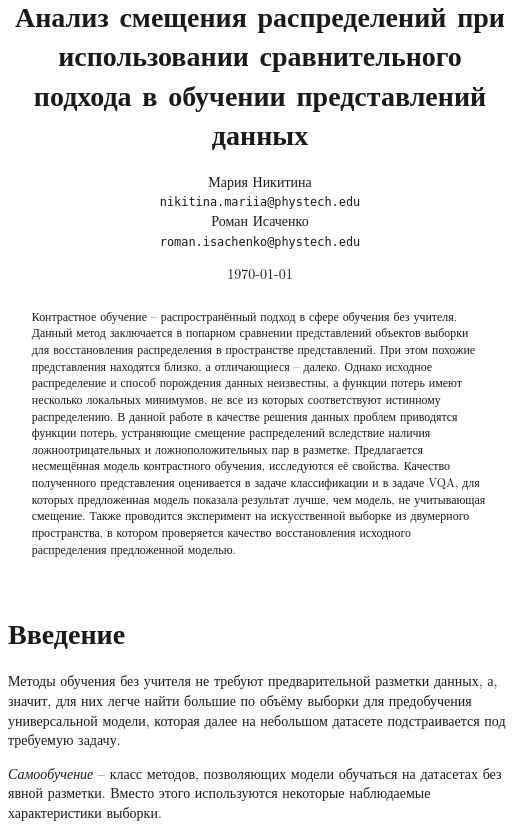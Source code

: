\documentclass[a4paper, 14pt]{article}
\title{Анализ смещения распределений при использовании сравнительного подхода в обучении представлений данных}
\author{
    Мария Никитина \\
	\texttt{nikitina.mariia@phystech.edu} \\
	\And
 	Роман Исаченко \\
	\texttt{roman.isachenko@phystech.edu}
}
\date{\today}
\begin{document}
% 
\setcounter{page}{2}

\begin{abstract}
Контрастное обучение -- распространённый подход в сфере обучения без учителя. Данный метод заключается в попарном сравнении представлений объектов выборки для восстановления распределения в пространстве представлений. При этом похожие представления находятся близко, а отличающиеся -- далеко. Однако исходное распределение и способ порождения данных неизвестны, а функции потерь имеют несколько локальных минимумов, не все из которых соответствуют истинному распределению. В данной работе в качестве решения данных проблем приводятся функции потерь, устраняющие смещение распределений вследствие наличия ложноотрицательных и ложноположительных пар в разметке. Предлагается несмещённая модель контрастного обучения, исследуются её свойства. Качество полученного представления оценивается  в задаче классификации и в задаче VQA, для которых предложенная модель показала результат лучше, чем модель, не учитывающая смещение. Также проводится эксперимент на искусственной выборке из двумерного пространства, в котором проверяется качество восстановления исходного распределения предложенной моделью.
\end{abstract}


\newpage

\tableofcontents
\clearpage %


\section{Введение}

Методы обучения без учителя не требуют предварительной разметки данных, а, значит, для них легче найти большие по объёму выборки для предобучения универсальной модели, которая далее на небольшом датасете подстраивается под требуемую задачу.

\textit{Самообучение} -- класс методов, позволяющих модели обучаться на датасетах без явной разметки. Вместо этого используются некоторые наблюдаемые характеристики выборки.
\end{document}
